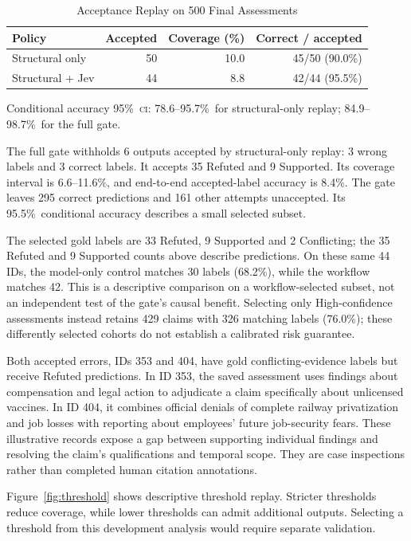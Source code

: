 \documentclass[conference]{IEEEtran}
\newcommand{\CI}{\textsc{ci}}
\newcommand{\pct}{\%}
\begin{document}
\begin{table}[t]
\caption{Acceptance Replay on 500 Final Assessments}
\label{tab:acceptance}
\centering
\footnotesize
\begin{tabular}{@{}lrrr@{}}
\toprule
Policy & Accepted & Coverage (\pct) & Correct / accepted\\
\midrule
Structural only & 50 & 10.0 & 45/50 (90.0\pct)\\
Structural + Jev & 44 & 8.8 & 42/44 (95.5\pct)\\
\bottomrule
\end{tabular}
\par\smallskip
\parbox{\columnwidth}{\footnotesize Conditional accuracy 95\pct\ \CI: 78.6--95.7\pct\ for structural-only replay; 84.9--98.7\pct\ for the full gate.}
\end{table}

The full gate withholds 6 outputs accepted by structural-only replay: 3 wrong labels and 3 correct labels. It accepts 35 Refuted and 9 Supported. Its coverage interval is 6.6--11.6\pct, and end-to-end accepted-label accuracy is 8.4\pct. The gate leaves 295 correct predictions and 161 other attempts unaccepted. Its 95.5\pct\ conditional accuracy describes a small selected subset.

The selected gold labels are 33 Refuted, 9 Supported and 2 Conflicting; the 35 Refuted and 9 Supported counts above describe predictions. On these same 44 IDs, the model-only control matches 30 labels (68.2\pct), while the workflow matches 42. This is a descriptive comparison on a workflow-selected subset, not an independent test of the gate's causal benefit. Selecting only High-confidence assessments instead retains 429 claims with 326 matching labels (76.0\pct); these differently selected cohorts do not establish a calibrated risk guarantee.

Both accepted errors, IDs 353 and 404, have gold conflicting-evidence labels but receive Refuted predictions. In ID 353, the saved assessment uses findings about compensation and legal action to adjudicate a claim specifically about unlicensed vaccines. In ID 404, it combines official denials of complete railway privatization and job losses with reporting about employees' future job-security fears. These illustrative records expose a gap between supporting individual findings and resolving the claim's qualifications and temporal scope. They are case inspections rather than completed human citation annotations.

Figure~\ref{fig:threshold} shows descriptive threshold replay. Stricter thresholds reduce coverage, while lower thresholds can admit additional outputs. Selecting a threshold from this development analysis would require separate validation.
\end{document}
